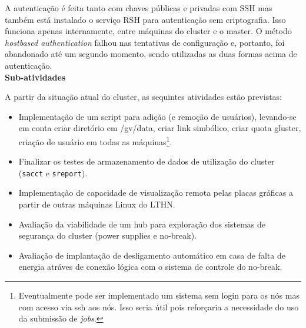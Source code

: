 A autenticação é feita tanto com chaves públicas e privadas com SSH mas também 
está instalado o serviço RSH para autenticação sem criptografia. Isso funciona 
apenas internamente, entre máquinas do cluster e o master. O método 
\textit{hostbased authentication} falhou nas tentativas de configuração e, portanto, foi abandonado até um segundo momento, sendo utilizadas as duas 
formas acima de autenticação.\\

\textbf{Sub-atividades}

A partir da situação atual do cluster, as sequintes atividades estão previstas:
\begin{itemize}
	\item[1] Implementação de um script para adição (e remoção de usuários), levando-se em conta criar diretório em /gv/data, criar link simbólico, criar quota gluster, criação de usuário em todas as máquinas\footnote{Eventualmente pode ser implementado um sistema sem login para os nós mas com acesso via ssh aos nós. Isso seria útil pois reforçaria a necessidade do uso da submissão de \textit{jobs}.}.
	\item[2] Finalizar os testes de armazenamento de dados de utilização do cluster (\texttt{sacct} e \texttt{sreport}).
	\item[3] Implementação de capacidade de visualização remota pelas placas gráficas a partir de outras máquinas Linux do LTHN.
	\item[4] Avaliação da viabilidade de um hub para exploração dos sistemas de segurança do cluster (power supplies e no-break).
	\item[5] Avaliação de implantação de desligamento automático em casa de falta de energia atráves de conexão lógica com o sistema de controle do no-break.
\end{itemize}

